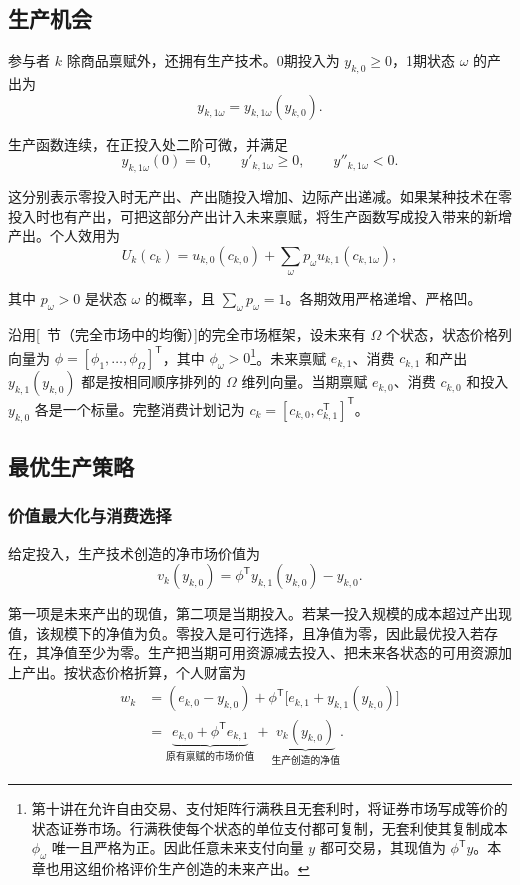 \subsection{生产机会}
参与者 $k$ 除商品禀赋外，还拥有生产技术。0期投入为 $y_{k,0}\ge0$，1期状态 $\omega$ 的产出为
\begin{equation}
 y_{k,1\omega}=y_{k,1\omega}(y_{k,0}).\label{eq:wj-15-1}
\end{equation}
\begin{tcolorbox}[knowledge]
生产函数连续，在正投入处二阶可微，并满足
\[
 y_{k,1\omega}(0)=0,\qquad
 y'_{k,1\omega}\ge0,\qquad y''_{k,1\omega}<0.
\]

这分别表示零投入时无产出、产出随投入增加、边际产出递减。如果某种技术在零投入时也有产出，可把这部分产出计入未来禀赋，将生产函数写成投入带来的新增产出。个人效用为
\[
 U_k(c_k)=u_{k,0}(c_{k,0})+\sum_\omega p_\omega u_{k,1}(c_{k,1\omega}),
\]

其中 $p_\omega>0$ 是状态 $\omega$ 的概率，且 $\sum_\omega p_\omega=1$。各期效用严格递增、严格凹。
\end{tcolorbox}

沿用[~节（完全市场中的均衡）]的完全市场框架，设未来有 $\Omega$ 个状态，状态价格列向量为 $\phi=[\phi_1,\ldots,\phi_\Omega]^{\mathsf T}$，其中 $\phi_\omega>0$\footnote{第十讲在允许自由交易、支付矩阵行满秩且无套利时，将证券市场写成等价的状态证券市场。行满秩使每个状态的单位支付都可复制，无套利使其复制成本 $\phi_\omega$ 唯一且严格为正。因此任意未来支付向量 $y$ 都可交易，其现值为 $\phi^{\mathsf T}y$。本章也用这组价格评价生产创造的未来产出。}。未来禀赋 $e_{k,1}$、消费 $c_{k,1}$ 和产出 $y_{k,1}(y_{k,0})$ 都是按相同顺序排列的 $\Omega$ 维列向量。当期禀赋 $e_{k,0}$、消费 $c_{k,0}$ 和投入 $y_{k,0}$ 各是一个标量。完整消费计划记为 $c_k=[c_{k,0},c_{k,1}^{\mathsf T}]^{\mathsf T}$。

\subsection{最优生产策略}
\subsubsection{价值最大化与消费选择}
给定投入，生产技术创造的净市场价值为
\begin{equation}
 v_k(y_{k,0})=\phi^{\mathsf T}y_{k,1}(y_{k,0})-y_{k,0}.\label{eq:wj-15-2}
\end{equation}

第一项是未来产出的现值，第二项是当期投入。若某一投入规模的成本超过产出现值，该规模下的净值为负。零投入是可行选择，且净值为零，因此最优投入若存在，其净值至少为零。生产把当期可用资源减去投入、把未来各状态的可用资源加上产出。按状态价格折算，个人财富为
\begin{equation}
 \begin{aligned}
 w_k&=(e_{k,0}-y_{k,0})+\phi^{\mathsf T}\bigl[e_{k,1}+y_{k,1}(y_{k,0})\bigr]\\
 &=\underbrace{e_{k,0}+\phi^{\mathsf T}e_{k,1}}_{\text{原有禀赋的市场价值}}
 +\underbrace{v_k(y_{k,0})}_{\text{生产创造的净值}}.
 \end{aligned}
 \label{eq:wj-15-3}
\end{equation}

